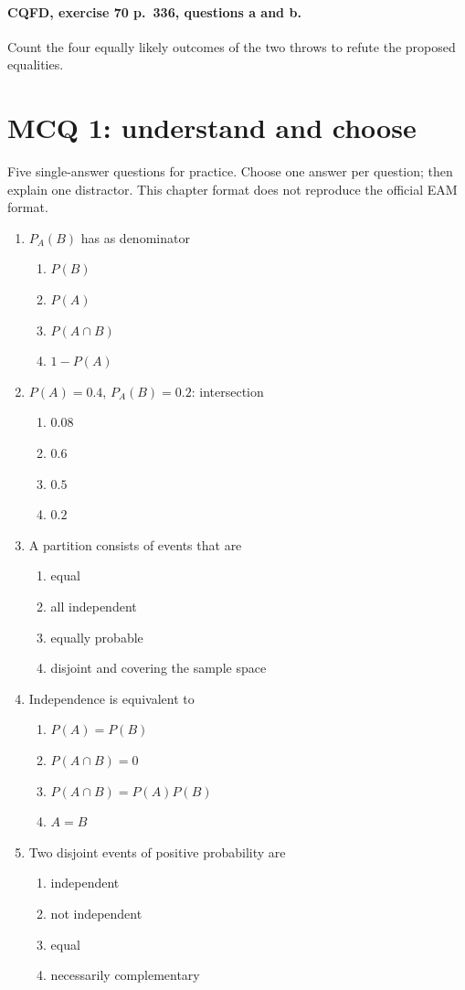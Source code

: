 \paragraph{CQFD, exercise 70 p.~336, questions a and b.}\label{C05-M2} Count the four equally likely outcomes of the two throws to refute the proposed equalities.
\begingroup\small
\mxnewpage\section*{MCQ 1: understand and choose}\label{C05-Q1}
Five single-answer questions for practice. Choose one answer per question; then explain one distractor. This chapter format does not reproduce the official EAM format.
\begin{enumerate}
\item $P_A(B)$ has as denominator
\begin{enumerate}[label=\Alph*.,itemsep=2pt]
\item $P(B)$
\item $P(A)$
\item $P(A\cap B)$
\item $1-P(A)$
\end{enumerate}
\item $P(A)=0.4$, $P_A(B)=0.2$: intersection
\begin{enumerate}[label=\Alph*.,itemsep=2pt]
\item $0.08$
\item $0.6$
\item $0.5$
\item $0.2$
\end{enumerate}
\item A partition consists of events that are
\begin{enumerate}[label=\Alph*.,itemsep=2pt]
\item equal
\item all independent
\item equally probable
\item disjoint and covering the sample space
\end{enumerate}
\item Independence is equivalent to
\begin{enumerate}[label=\Alph*.,itemsep=2pt]
\item $P(A)=P(B)$
\item $P(A\cap B)=0$
\item $P(A\cap B)=P(A)P(B)$
\item $A=B$
\end{enumerate}
\item Two disjoint events of positive probability are
\begin{enumerate}[label=\Alph*.,itemsep=2pt]
\item independent
\item not independent
\item equal
\item necessarily complementary
\end{enumerate}
\end{enumerate}

